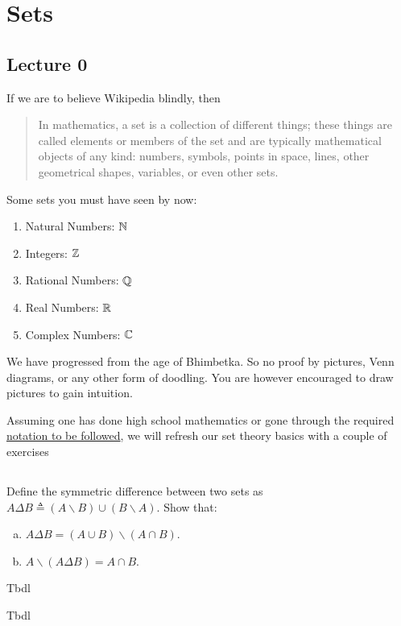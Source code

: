 \chapter{Sets}
\label{ch:sets}

\section{Lecture 0}

If we are to believe Wikipedia blindly, then
\begin{quote}
	In mathematics, a set is a collection of different things; these things are called elements or members of the set and are typically mathematical objects of any kind: numbers, symbols, points in space, lines, other geometrical shapes, variables, or even other sets.
\end{quote}

\begin{example}
	Some sets you must have seen by now:
	\begin{enumerate}
	\item Natural Numbers: $\mathbb N$
	\item Integers: $\mathbb Z$
	\item Rational Numbers: $\mathbb Q$
	\item Real Numbers: $\mathbb R$
	\item Complex Numbers: $\mathbb C$
	\end{enumerate}
\end{example}

\begin{abuse}
	We have progressed from the age of Bhimbetka. So no proof by pictures, Venn diagrams, or any other form of
	doodling. You are however encouraged to draw pictures to gain intuition.
\end{abuse}

Assuming one has done high school mathematics or gone through the required \hyperref[ch:sets_functions]{notation to be followed}, we will refresh our set theory basics with a couple of exercises

\section{\problemhead}

\begin{problem}
	 Define the symmetric difference between two sets as $A \Delta B \triangleq(A \backslash B) \cup(B \backslash A)$. Show that:
	 \begin{enumerate}[a)]
		\item $A \Delta B=(A \cup B) \backslash(A \cap B)$.
		\item $A \backslash(A \Delta B)=A \cap B$.
	\end{enumerate}
	\begin{hint}
		Tbdl
	\end{hint}
	\begin{sol}
		Tbdl
	\end{sol}
\end{problem}

